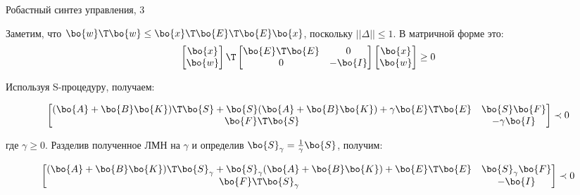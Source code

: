 \documentclass{beamer}
\begin{document}
\begin{frame}{Робастный синтез управления, 3}
	\begin{flushleft}
		
		
		Заметим, что $\bo{w}\T\bo{w} \leq \bo{x}\T \bo{E}\T \bo{E} \bo{x}$, поскольку $|| \Delta || \leq 1$. В матричной форме это:
		\begin{equation}
			\begin{bmatrix}
				\bo{x} \\ \bo{w}
			\end{bmatrix}\T
			\begin{bmatrix}
				\bo{E}\T \bo{E} & 0 \\
				0 & -\bo{I}
			\end{bmatrix}
			\begin{bmatrix}
				\bo{x} \\ \bo{w}
			\end{bmatrix} \geq 0
		\end{equation}
		
		Используя S-процедуру, получаем:
		
		\begin{equation}
			\begin{bmatrix}
				(\bo{A} + \bo{B}\bo{K})\T\bo{S} + \bo{S} (\bo{A} + \bo{B}\bo{K}) + \gamma \bo{E}\T \bo{E} & \bo{S}\bo{F} \\
				\bo{F}\T\bo{S} & -\gamma\bo{I}
			\end{bmatrix} \prec 0
		\end{equation}		
		
		где $\gamma \geq 0$. Разделив полученное ЛМН на $\gamma$ и определив $\bo{S}_\gamma = \frac{1}{\gamma}\bo{S}$, получим:
		
		\begin{equation}
			\begin{bmatrix}
				(\bo{A} + \bo{B}\bo{K})\T\bo{S}_\gamma + \bo{S}_\gamma (\bo{A} + \bo{B}\bo{K}) + \bo{E}\T \bo{E} & \bo{S}_\gamma\bo{F} \\
				\bo{F}\T\bo{S}_\gamma & -\bo{I}
			\end{bmatrix} \prec 0
		\end{equation}
		
		
		
		
	\end{flushleft}
\end{frame}
\end{document}
